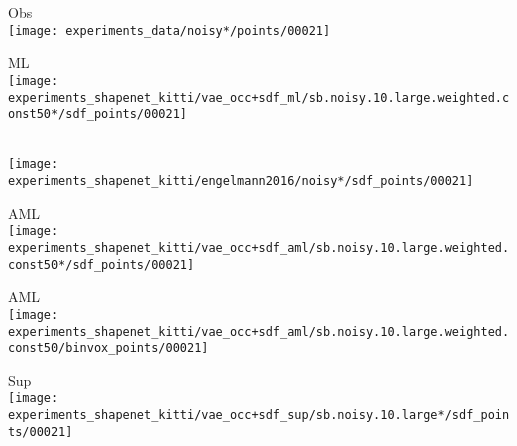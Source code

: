 \begin{minipage}[t]{0.02\textwidth}
    \vspace{0px}
\end{minipage}
\begin{minipage}[t]{0.1\textwidth}
    \vspace{0px}
    \centering
    \small Obs\\
    \texttt{[image: experiments\_data/noisy*/points/00021]}
\end{minipage}
\begin{minipage}[t]{0.1\textwidth}
    \vspace{0px}
    \centering
    \small ML\\
    \texttt{[image: experiments\_shapenet\_kitti/vae\_occ+sdf\_ml/sb.noisy.10.large.weighted.const50*/sdf\_points/00021]}
\end{minipage}
\begin{minipage}[t]{0.1\textwidth}
    \vspace{0px}
    \centering
    \small \cite{Engelmann2016GCPR}\\
    \texttt{[image: experiments\_shapenet\_kitti/engelmann2016/noisy*/sdf\_points/00021]}
\end{minipage}
\begin{minipage}[t]{0.1\textwidth}
    \vspace{0px}
    \centering
    \small AML\\
    \texttt{[image: experiments\_shapenet\_kitti/vae\_occ+sdf\_aml/sb.noisy.10.large.weighted.const50*/sdf\_points/00021]}
\end{minipage}
\begin{minipage}[t]{0.1\textwidth}
    \vspace{0px}
    \centering
    \small AML\\
    \texttt{[image: experiments\_shapenet\_kitti/vae\_occ+sdf\_aml/sb.noisy.10.large.weighted.const50/binvox\_points/00021]}
\end{minipage}
\begin{minipage}[t]{0.1\textwidth}
    \vspace{0px}
    \centering
    \small Sup\\
    \texttt{[image: experiments\_shapenet\_kitti/vae\_occ+sdf\_sup/sb.noisy.10.large*/sdf\_points/00021]}
\end{minipage}

